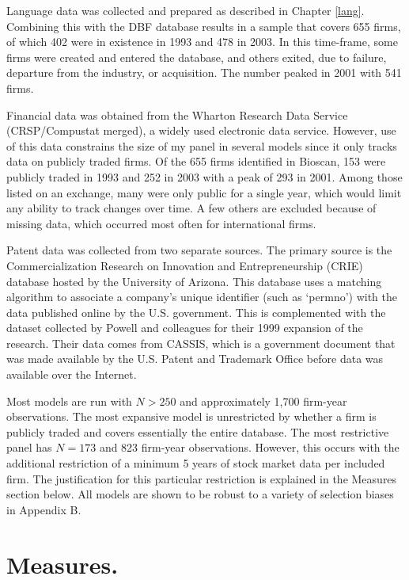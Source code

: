 Language data was collected and prepared as described in Chapter \ref{lang}. Combining this with the DBF database results in a sample that covers 655 firms, of which 402 were in existence in 1993 and 478 in 2003. In this time-frame, some firms were created and entered the database, and others exited, due to failure, departure from the industry, or acquisition. The number peaked in 2001 with 541 firms.

Financial data was obtained from the Wharton Research Data Service (CRSP/Compustat merged), a widely used electronic data service. However, use of this data constrains the size of my panel in several models since it only tracks data on publicly traded firms. Of the 655 firms identified in Bioscan, 153 were publicly traded in 1993 and 252 in 2003 with a peak of 293 in 2001. Among those listed on an exchange, many were only public for a single year, which would limit any ability to track changes over time. A few others are excluded because of missing data, which occurred most often for international firms. 

Patent data was collected from two separate sources. The primary source is the Commercialization Research on Innovation and Entrepreneurship (CRIE) database hosted by the University of Arizona. This database uses a matching algorithm to associate a company's unique identifier (such as `permno') with the data published online by the U.S. government. This is complemented with the dataset collected by Powell and colleagues for their 1999 expansion of the \citet{powell1996} research. Their data comes from CASSIS, which is a government document that was made available by the U.S. Patent and Trademark Office before data was available over the Internet.

Most models are run with $N>250$ and approximately 1,700 firm-year observations. The most expansive model is unrestricted by whether a firm is publicly traded and covers essentially the entire database. The most restrictive panel has $N=173$ and 823 firm-year observations. However, this occurs with the additional restriction of a minimum 5 years of stock market data per included firm. The justification for this particular restriction is explained in the Measures section below. All models are shown to be robust to a variety of selection biases in Appendix B.

\section{Measures.}

